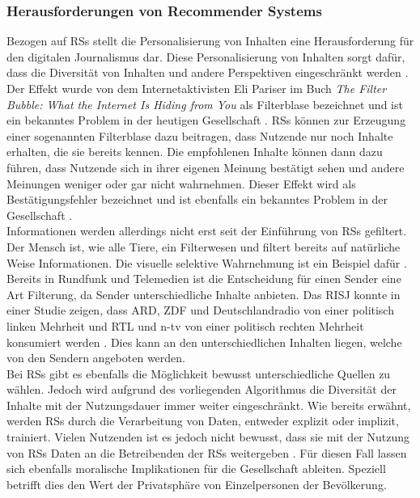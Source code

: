\subsubsection{Herausforderungen von Recommender Systems}
Bezogen auf \acp{RS} stellt die Personalisierung von Inhalten eine Herausforderung für den digitalen Journalismus dar.
Diese Personalisierung von Inhalten sorgt dafür, dass die Diversität von Inhalten und andere Perspektiven eingeschränkt werden \cite{rundfunk}.
Der Effekt wurde von dem Internetaktivisten Eli Pariser im Buch \textit{The Filter Bubble: What the Internet Is Hiding from You} als Filterblase bezeichnet und ist ein bekanntes Problem in der heutigen Gesellschaft \cite{filter-bubble}.
\acp{RS} können zur Erzeugung einer sogenannten Filterblase dazu beitragen, dass Nutzende nur noch Inhalte erhalten, die sie bereits kennen.
Die empfohlenen Inhalte können dann dazu führen, dass Nutzende sich in ihrer eigenen Meinung bestätigt sehen und andere Meinungen weniger oder gar nicht wahrnehmen.
Dieser Effekt wird als Bestätigungsfehler bezeichnet und ist ebenfalls ein bekanntes Problem in der Gesellschaft \cite{reasoning-rule}. \\

Informationen werden allerdings nicht erst seit der Einführung von \acp{RS} gefiltert.
Der Mensch ist, wie alle Tiere, ein \glqq Filterwesen\grqq{} und filtert bereits auf natürliche Weise Informationen.
Die visuelle selektive Wahrnehmung ist ein Beispiel dafür \cite{selective-perception}.
Bereits in Rundfunk und Telemedien ist die Entscheidung für einen Sender eine Art Filterung, da Sender unterschiedliche Inhalte anbieten.
Das \ac{RISJ} konnte in einer Studie zeigen, dass ARD, ZDF und Deutschlandradio von einer politisch linken Mehrheit und RTL und n-tv von einer politisch rechten Mehrheit konsumiert werden \cite{public-service-news}.
Dies kann an den unterschiedlichen Inhalten liegen, welche von den Sendern angeboten werden. \\

Bei \acp{RS} gibt es ebenfalls die Möglichkeit bewusst unterschiedliche Quellen zu wählen.
Jedoch wird aufgrund des vorliegenden Algorithmus die Diversität der Inhalte mit der Nutzungsdauer immer weiter eingeschränkt.
Wie bereits erwähnt, werden \acp{RS} durch die Verarbeitung von Daten, entweder explizit oder implizit, trainiert.
Vielen Nutzenden ist es jedoch nicht bewusst, dass sie mit der Nutzung von \acp{RS} Daten an die Betreibenden der \acp{RS} weitergeben \cite{privacy-rs}.
Für diesen Fall lassen sich ebenfalls moralische Implikationen für die Gesellschaft ableiten.
Speziell betrifft dies den Wert der Privatsphäre von Einzelpersonen der Bevölkerung.\\

